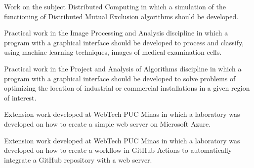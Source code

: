 \documentclass[10pt,a4paper,ragged2e,withhyper]{altacv}
\begin{document}
\begin{paracol}{2}
            Work on the subject Distributed Computing in which a simulation of the functioning of Distributed Mutual Exclusion algorithms should be developed.\\
            \divider

            Practical work in the Image Processing and Analysis discipline in which a program with a graphical interface should be developed to process and classify, using machine learning techniques, images of medical examination cells.\\
            \divider
            
            Practical work in the Project and Analysis of Algorithms discipline in which a program with a graphical interface should be developed to solve problems of optimizing the location of industrial or commercial installations in a given region of interest.\\
            \divider

            Extension work developed at WebTech PUC Minas in which a laboratory was developed on how to create a simple web server on Microsoft Azure.\\
            \divider
        
            Extension work developed at WebTech PUC Minas in which a laboratory was developed on how to create a workflow in GitHub Actions to automatically integrate a GitHub repository with a web server.\\
            \divider


\end{paracol}
\end{document}
